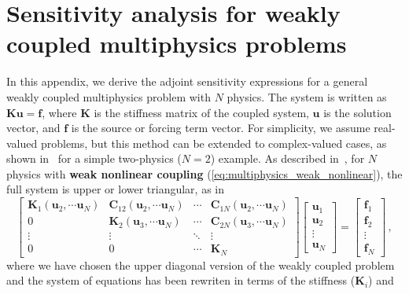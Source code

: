\section{Sensitivity analysis for weakly coupled multiphysics problems}\label{app:appendix1}
In this appendix, we derive the adjoint sensitivity expressions for a general weakly coupled multiphysics
 problem with $N$ physics. The system is written as $\mathbf{K}\mathbf{u} = \mathbf{f}$, where $\mathbf{K}$ is 
 the stiffness matrix of the coupled system, $\mathbf{u}$ is the solution vector, and $\mathbf{f}$ is the source or forcing term vector. For 
 simplicity, we assume real-valued problems, but this method can be extended to complex-valued cases, as shown
  in~\cite{ownpub0} for a simple two-physics ($N=2$) example. As described in~, 
  for $N$ physics with \textbf{weak nonlinear coupling} (\eqref{eq:multiphysics_weak_nonlinear}), the full 
  system is upper or lower triangular, as in
\begin{equation} \label{eq:app_multiphysics_weak}
    \begin{bmatrix}
        \mathbf{K}_1(\mathbf{u}_2, \cdots \mathbf{u}_N)    & \mathbf{C}_{12} (\mathbf{u}_2, \cdots \mathbf{u}_N)& \cdots & \mathbf{C}_{1N}(\mathbf{u}_2, \cdots \mathbf{u}_N) \\
        0 & \mathbf{K}_2 (\mathbf{u}_3, \cdots \mathbf{u}_N)   & \cdots & \mathbf{C}_{2N} (\mathbf{u}_3, \cdots \mathbf{u}_N)\\
        \vdots          & \vdots          & \ddots & \vdots          \\
        0& 0 & \cdots & \mathbf{K}_N
    \end{bmatrix}
    \begin{bmatrix}
        \mathbf{u}_1 \\
        \mathbf{u}_2 \\
        \vdots       \\
        \mathbf{u}_N
    \end{bmatrix}
    =
    \begin{bmatrix}
        \mathbf{f}_1\\
        \mathbf{f}_2\\
        \vdots       \\
        \mathbf{f}_N
    \end{bmatrix}\,,
\end{equation}
where we have chosen the upper diagonal version of the weakly coupled problem and the system of equations has been rewriten in terms of the stiffness ($\mathbf{K}_i$) and 

